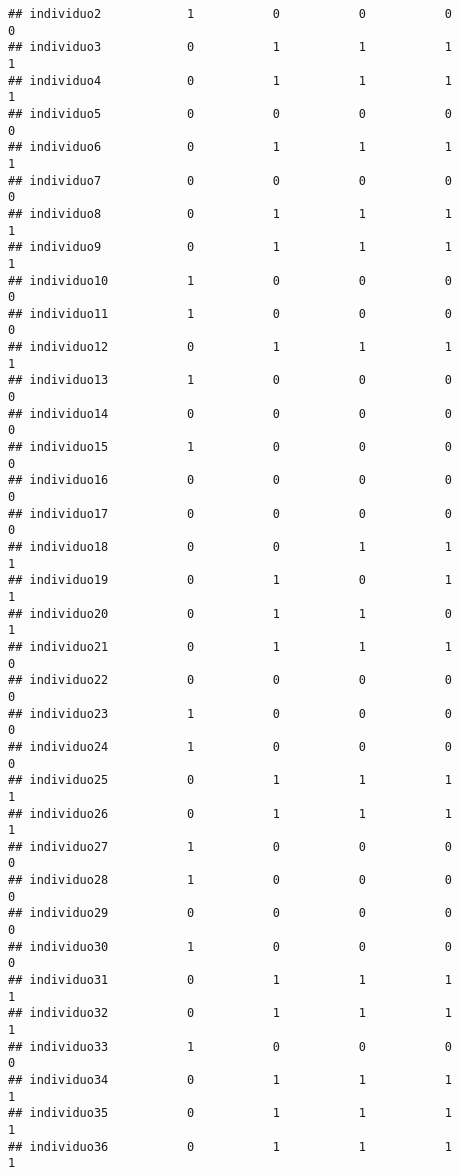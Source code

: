 \documentclass[
]{article}
\begin{document}
\begin{verbatim}
## individuo2            1           0           0           0           0
## individuo3            0           1           1           1           1
## individuo4            0           1           1           1           1
## individuo5            0           0           0           0           0
## individuo6            0           1           1           1           1
## individuo7            0           0           0           0           0
## individuo8            0           1           1           1           1
## individuo9            0           1           1           1           1
## individuo10           1           0           0           0           0
## individuo11           1           0           0           0           0
## individuo12           0           1           1           1           1
## individuo13           1           0           0           0           0
## individuo14           0           0           0           0           0
## individuo15           1           0           0           0           0
## individuo16           0           0           0           0           0
## individuo17           0           0           0           0           0
## individuo18           0           0           1           1           1
## individuo19           0           1           0           1           1
## individuo20           0           1           1           0           1
## individuo21           0           1           1           1           0
## individuo22           0           0           0           0           0
## individuo23           1           0           0           0           0
## individuo24           1           0           0           0           0
## individuo25           0           1           1           1           1
## individuo26           0           1           1           1           1
## individuo27           1           0           0           0           0
## individuo28           1           0           0           0           0
## individuo29           0           0           0           0           0
## individuo30           1           0           0           0           0
## individuo31           0           1           1           1           1
## individuo32           0           1           1           1           1
## individuo33           1           0           0           0           0
## individuo34           0           1           1           1           1
## individuo35           0           1           1           1           1
## individuo36           0           1           1           1           1

\end{verbatim}
\end{document}
